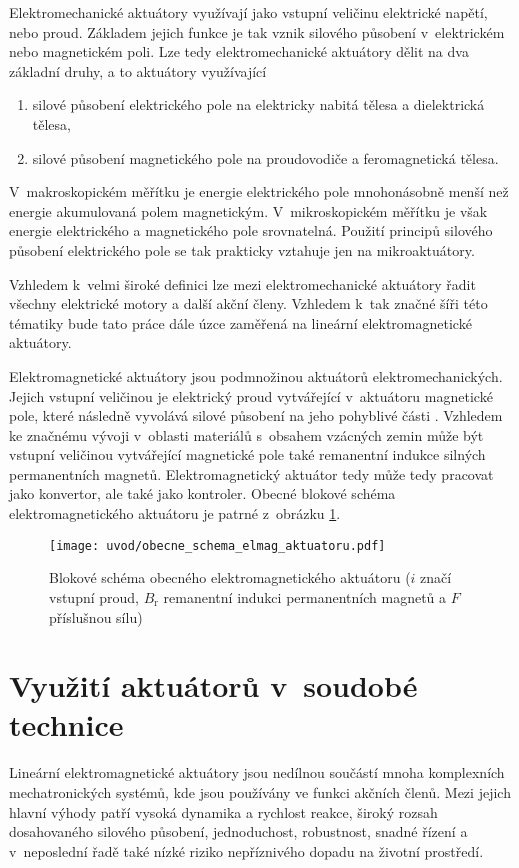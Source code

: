 Elektromechanické aktuátory využívají jako vstupní veličinu elektrické napětí, nebo proud. Základem jejich funkce je tak vznik silového působení v~elektrickém nebo magnetickém poli. Lze tedy elektromechanické aktuátory dělit na dva základní druhy, a to aktuátory využívající
\begin{enumerate}[a]
    \item silové působení elektrického pole na elektricky nabitá tělesa a dielektrická tělesa,
    \item silové působení magnetického pole na proudovodiče a feromagnetická tělesa.
\end{enumerate}

V~makroskopickém měřítku je energie elektrického pole mnohonásobně menší než energie akumulovaná polem magnetickým. V~mikroskopickém měřítku je však energie elektrického a magnetického pole srovnatelná. Použití principů silového působení elektrického pole se tak prakticky vztahuje jen na mikroaktuátory. \cite{husak2008mikrosenzory}

Vzhledem k~velmi široké definici lze mezi elektromechanické aktuátory řadit všechny elektrické motory a další akční členy. Vzhledem k~tak značné šíři této tématiky bude tato práce dále úzce zaměřená na lineární elektromagnetické aktuátory.

Elektromagnetické aktuátory jsou podmnožinou aktuátorů elektromechanických. Jejich vstupní veličinou je elektrický proud vytvářející v~aktuátoru magnetické pole, které následně vyvolává silové působení na jeho pohyblivé části \cite{boldea2005linear}. Vzhledem ke značnému vývoji v~oblasti materiálů s~obsahem vzácných zemin může být vstupní veličinou vytvářející magnetické pole také remanentní indukce silných permanentních magnetů. Elektromagnetický aktuátor tedy může tedy pracovat jako konvertor, ale také jako kontroler. Obecné blokové schéma elektromagnetického aktuátoru je patrné z~obrázku \cref{obr:obecne_schema_elmag_aktuatoru}. \cite{mach2010aktuatory}

\begin{figure}[h!]
  \centering
  \texttt{[image: uvod/obecne\_schema\_elmag\_aktuatoru.pdf]}
  \caption{Blokové schéma obecného elektromagnetického aktuátoru ($i$ značí vstupní proud, $B_\mathrm{r}$ remanentní indukci permanentních magnetů a $F$ příslušnou sílu)}
  \label{obr:obecne_schema_elmag_aktuatoru}
\end{figure}

\section{Využití aktuátorů v~soudobé technice}
Lineární elektromagnetické aktuátory jsou nedílnou součástí mnoha komplexních mechatronických systémů, kde jsou používány ve funkci akčních členů. Mezi jejich hlavní výhody patří vysoká dynamika a rychlost reakce, široký rozsah dosahovaného silového působení, jednoduchost, robustnost, snadné řízení a v~neposlední řadě také nízké riziko nepříznivého dopadu na životní prostředí. \cite{gomis2010design}


